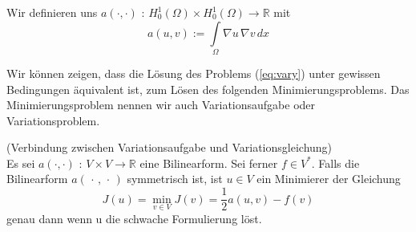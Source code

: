 Wir definieren uns $a( \cdot , \cdot )$ : $H^1_0 (\Omega) \times H^1_0(\Omega) \rightarrow \mathbb{R}$ mit
\begin{equation*}
a(u,v) := \int\limits_{\Omega} \nabla u \, \nabla v \, dx
\end{equation*}

Wir können zeigen, dass die Lösung des Problems (\ref{eq:vary}) unter gewissen Bedingungen äquivalent ist, zum Lösen des folgenden Minimierungsproblems. Das Minimierungsproblem nennen wir auch Variationsaufgabe oder Variationsproblem.

\begin{Satz} (Verbindung zwischen Variationsaufgabe und Variationsgleichung) \\
Es sei $a( \cdot , \cdot )$ : $ V \times V \rightarrow \mathbb{R} $ eine Bilinearform. Sei ferner $f \in V^{*}$.
Falls die Bilinearform $a(\, \cdot \, , \, \cdot \, )$ symmetrisch ist, ist $u \in V$ ein Minimierer der Gleichung
\begin{equation} \label{eq:mini}
J(u) = \min_{v \in V} J(v) = \dfrac{1}{2} a(u,v) - f(v)
\end{equation}
genau dann wenn u die schwache Formulierung löst.
\end{Satz}



